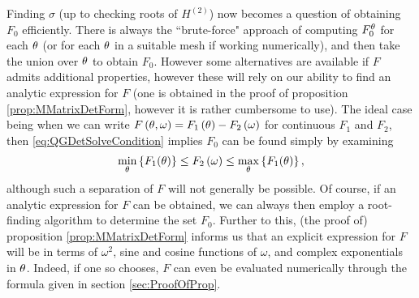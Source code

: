 Finding $\sigma$ (up to checking roots of $H^{(2)}$) now becomes a question of obtaining $F_0$ efficiently.
There is always the ``brute-force" approach of computing $F_0^{\theta}$ for each $\theta$ (or for each $\theta$ in a suitable mesh if working numerically), and then take the union over $\theta$ to obtain $F_0$.
However some alternatives are available if $F$ admits additional properties, however these will rely on our ability to find an analytic expression for $F$ (one is obtained in the proof of proposition \ref{prop:MMatrixDetForm}, however it is rather cumbersome to use).
The ideal case being when we can write $F\left( \theta,\omega \right) = F_1\left( \theta \right) - F_2\left( \omega \right)$ for continuous $F_1$ and $F_2$, then \eqref{eq:QGDetSolveCondition} implies $F_0$ can be found simply by examining
\begin{align*}
	\min_{\theta}\left\{ F_1(\theta) \right\} \leq F_2\left( \omega \right) \leq \max_{\theta}\left\{ F_1(\theta) \right\},
\end{align*} 
although such a separation of $F$ will not generally be possible.
Of course, if an analytic expression for $F$ can be obtained, we can always then employ a root-finding algorithm to determine the set $F_0$.
Further to this, (the proof of) proposition \ref{prop:MMatrixDetForm} informs us that an explicit expression for $F$ will be in terms of $\omega^2$, sine and cosine functions of $\omega$, and complex exponentials in $\theta$.
Indeed, if one so chooses, $F$ can even be evaluated numerically through the formula given in section \ref{sec:ProofOfProp}.

